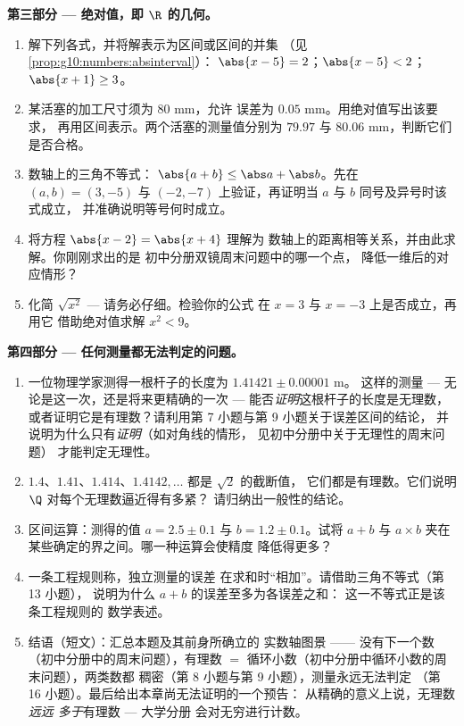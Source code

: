 \begin{problem}
\medskip
\noindent\textbf{第三部分 --- 绝对值，即
$\R$ 的几何。}
\begin{enumerate}[resume]
  \item 解下列各式，并将解表示为区间或区间的并集
        （见\cref{prop:g10:numbers:absinterval}）：
        $\abs{x - 5} = 2$；\quad $\abs{x - 5} < 2$；\quad
        $\abs{x + 1} \geq 3$。
  \item 某活塞的加工尺寸须为 $80$ mm，允许
        误差为 $0.05$ mm。用绝对值写出该要求，
        再用区间表示。两个活塞的测量值分别为
        $79.97$ 与 $80.06$ mm，判断它们是否合格。
  \item 数轴上的三角不等式：
        $\abs{a + b} \leq \abs a + \abs b$。先在
        $(a, b) = (3, -5)$ 与 $(-2, -7)$ 上验证，再证明当 $a$ 与
        $b$ 同号及异号时该式成立，
        并准确说明等号何时成立。
  \item 将方程 $\abs{x - 2} = \abs{x + 4}$ 理解为
        数轴上的距离相等关系，并由此求解。你刚刚求出的是
        初中分册双镜周末问题中的哪一个点，
        降低一维后的对应情形？
  \item 化简 $\sqrt{x^2}$ --- 请务必仔细。检验你的公式
        在 $x = 3$ 与 $x = -3$ 上是否成立，再用它
        借助绝对值求解 $x^2 < 9$。
\end{enumerate}

\medskip
\noindent\textbf{第四部分 --- 任何测量都无法判定的问题。}
\begin{enumerate}[resume]
  \item 一位物理学家测得一根杆子的长度为 $1.41421 \pm 0.00001$ m。
        这样的测量 --- 无论是这一次，还是将来更精确的一次 ---
        能否\emph{证明}这根杆子的长度是无理数，
        或者证明它是有理数？请利用第 7 小题与第 9 小题关于误差区间的结论，
        并说明为什么只有\emph{证明}（如对角线的情形，
        见初中分册中关于无理性的周末问题）
        才能判定无理性。
  \item $1.4$、$1.41$、$1.414$、$1.4142,\dots$ 都是 $\sqrt2$ 的截断值，
        它们都是有理数。它们说明
        $\Q$ 对每个无理数逼近得有多紧？
        请归纳出一般性的结论。
  \item 区间运算：测得的值 $a = 2.5 \pm 0.1$
        与 $b = 1.2 \pm 0.1$。试将 $a + b$ 与 $a \times b$
        夹在某些确定的界之间。哪一种运算会使精度
        降低得更多？
  \item 一条工程规则称，独立测量的误差
        在求和时“相加”。请借助三角不等式（第 13 小题），
        说明为什么 $a + b$ 的误差至多为各误差之和：
        这一不等式正是该条工程规则的
        数学表述。
  \item 结语（短文）：汇总本题及其前身所确立的
        实数轴图景 ——
        没有下一个数
        （初中分册中的周末问题），有理数 $=$
        循环小数（初中分册中循环小数的周末问题），两类数都
        稠密（第 8 小题与第 9 小题），测量永远无法判定
        （第 16 小题）。最后给出本章尚无法证明的一个预告：
        从精确的意义上说，无理数\emph{远远
        多于}有理数 --- 大学分册
        会对无穷进行计数。
\end{enumerate}
\end{problem}
